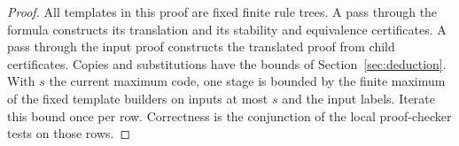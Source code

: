 \begin{proof}
All templates in this proof are fixed finite rule trees. A pass through the formula constructs its translation and its stability and equivalence certificates. A pass through the input proof constructs the translated proof from child certificates. Copies and substitutions have the bounds of Section~\ref{sec:deduction}. With $s$ the current maximum code, one stage is bounded by the finite maximum of the fixed template builders on inputs at most $s$ and the input labels. Iterate this bound once per row. Correctness is the conjunction of the local proof-checker tests on those rows.
\end{proof}
